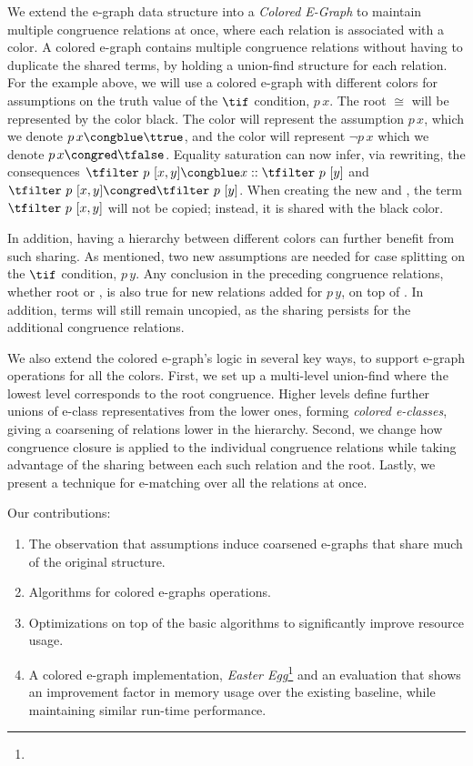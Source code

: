 We extend the e-graph data structure into a \emph{Colored E-Graph} to maintain multiple congruence relations at once, where each relation is associated with a color.
A colored e-graph contains multiple congruence relations without having to duplicate the shared terms, by holding a union-find structure for each relation.
For the example above, we will use a colored e-graph with different colors for assumptions on the truth value of the $\tif$ condition, $p\,x$. 
The root $\cong$ will be represented by the color black.
The color \cblue will represent the assumption $p\,x$, which we denote $p\,x \congblue \ttrue$, and the color \cred will represent $\lnot p\,x$ which we denote $p\,x \congred \tfalse$.
Equality saturation can now infer, via rewriting, the consequences $\tfilter~p~[x,y] \congblue x::\tfilter~p~[y]$ and $\tfilter~p~[x,y] \congred \tfilter~p~[y]$.
When creating the new \cblue and \cred, the term $\tfilter~p~[x,y]$ will not be copied; instead, it is shared with the black color.

In addition, having a hierarchy between different colors can further benefit from such sharing.
As mentioned, two new assumptions are needed for case splitting on the $\tif$ condition, $p\,y$.
Any conclusion in the preceding congruence relations, whether root or \cblue, is also true for new relations added for $p\,y$, on top of \cblue.
In addition, terms will still remain uncopied, as the sharing persists for the additional congruence relations.

We also extend the colored e-graph's logic in several key ways, to support e-graph operations for all the colors.
First, we set up a multi-level union-find where the lowest level corresponds to the root congruence.
Higher levels define further unions of e-class representatives from the lower ones, forming \emph{colored e-classes}, giving a coarsening of relations lower in the hierarchy.
Second, we change how congruence closure is applied to the individual congruence relations while taking advantage of the sharing between each such relation and the root. 
Lastly, we present a technique for e-matching over all the relations at once.

Our contributions:
\begin{enumerate}
    \item The observation that assumptions induce coarsened e-graphs that share much of the original structure. 
    \item Algorithms for colored e-graphs operations.
    \item Optimizations on top of the basic algorithms to significantly improve resource usage.
    \item A colored e-graph implementation, \emph{Easter Egg}\footnote{} and an evaluation that shows an improvement factor in memory usage over the existing baseline, while maintaining similar run-time performance.
\end{enumerate}